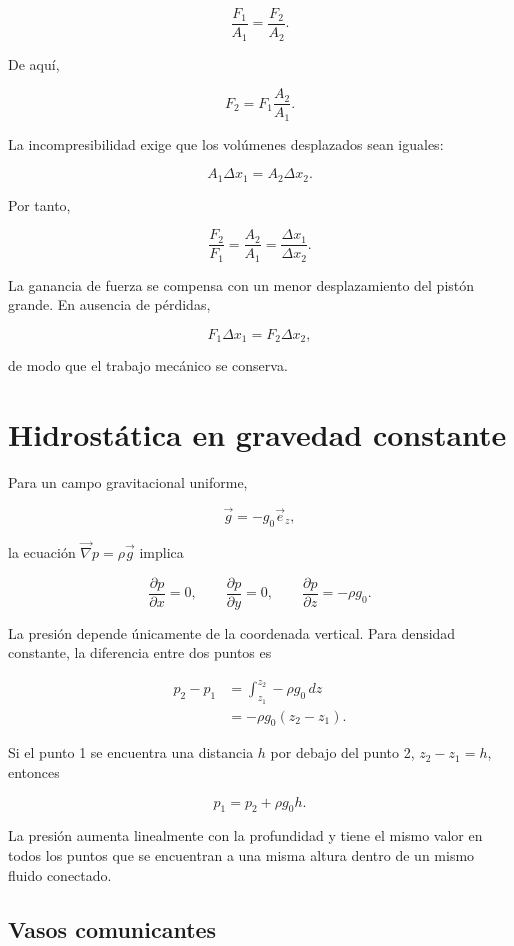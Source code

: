 $$
\frac{F_1}{A_1}=\frac{F_2}{A_2}.
$$

De aquí,

$$
\boxed{
F_2=F_1\frac{A_2}{A_1}
}.
$$

\figuraPrensaHidraulica

La incompresibilidad exige que los volúmenes desplazados sean iguales:

$$
A_1\Delta x_1=A_2\Delta x_2.
$$

Por tanto,

$$
\frac{F_2}{F_1}
=\frac{A_2}{A_1}
=\frac{\Delta x_1}{\Delta x_2}.
$$

La ganancia de fuerza se compensa con un menor desplazamiento del pistón
grande. En ausencia de pérdidas,

$$
F_1\Delta x_1=F_2\Delta x_2,
$$

de modo que el trabajo mecánico se conserva.

\section{Hidrostática en gravedad constante}

Para un campo gravitacional uniforme,

$$
\vec{g}=-g_0\vec{e}_z,
$$

la ecuación $\vec{\nabla}p=\rho\vec{g}$ implica

$$
\frac{\partial p}{\partial x}=0,
\qquad
\frac{\partial p}{\partial y}=0,
\qquad
\frac{\partial p}{\partial z}=-\rho g_0.
$$

La presión depende únicamente de la coordenada vertical. Para densidad
constante, la diferencia entre dos puntos es

$$
\begin{aligned}
p_2-p_1
&=\int_{z_1}^{z_2}-\rho g_0\,dz\\
&=-\rho g_0(z_2-z_1).
\end{aligned}
$$

Si el punto 1 se encuentra una distancia $h$ por debajo del punto 2,
$z_2-z_1=h$, entonces

$$
\boxed{
p_1=p_2+\rho g_0h
}.
$$

\figuraPresionProfundidad

La presión aumenta linealmente con la profundidad y tiene el mismo valor en
todos los puntos que se encuentran a una misma altura dentro de un mismo
fluido conectado.

\subsection{Vasos comunicantes}

